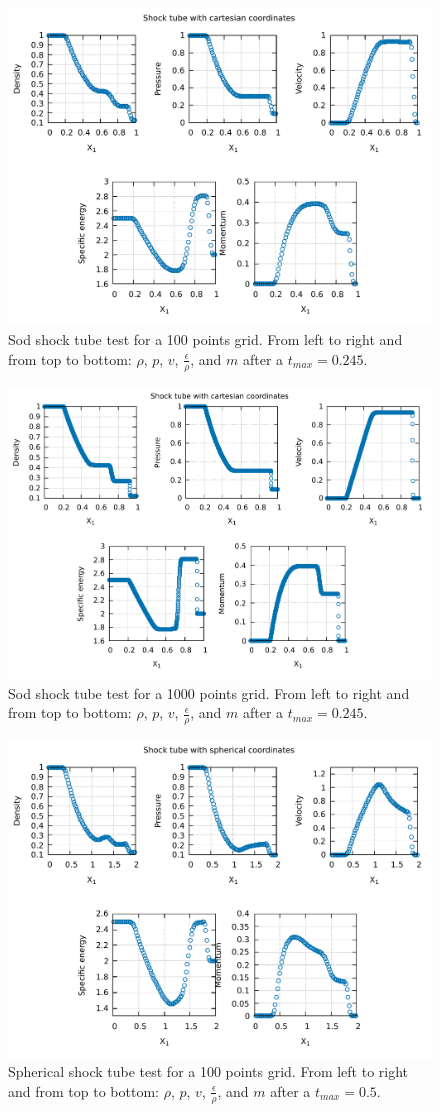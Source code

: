 \documentclass{article}
\begin{document}
\begin{figure}[H]
	\centering
	\includegraphics[width=0.8 \linewidth]{cartshock100.pdf}
	\caption{Sod shock tube test for a 100 points grid. From left to right and from top to bottom: $\rho$, $p$, $v$, $\frac{\epsilon}{\rho}$, and $m$ after a $t_{max}=0.245$.}
	\label{fig:cartshock100}
\end{figure}
\begin{figure}[H]
	\centering
	\includegraphics[width=0.8 \linewidth]{cartshock.pdf}
	\caption{Sod shock tube test for a 1000 points grid. From left to right and from top to bottom: $\rho$, $p$, $v$, $\frac{\epsilon}{\rho}$, and $m$ after a $t_{max}=0.245$.}
	\label{fig:cartshock1000}
\end{figure}
\begin{figure}[H]
	\centering
	\includegraphics[width=0.8 \linewidth]{spheshock100.pdf}
	\caption{Spherical shock tube test for a 100 points grid. From left to right and from top to bottom: $\rho$, $p$, $v$, $\frac{\epsilon}{\rho}$, and $m$ after a $t_{max}=0.5$.}
	\label{fig:spheshock100}
\end{figure}
\end{document}

